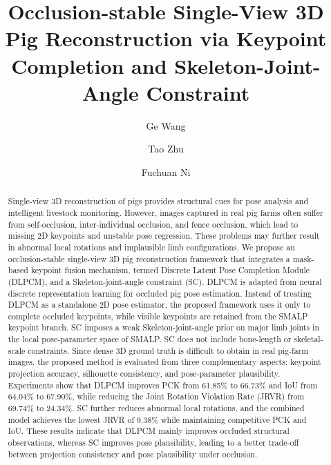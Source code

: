 \documentclass[runningheads]{llncs}
\begin{document}
\title{Occlusion-stable Single-View 3D Pig Reconstruction via Keypoint Completion and Skeleton-Joint-Angle Constraint}


\author{Ge Wang \and Tao Zhu \and Fuchuan Ni}



\maketitle

\begin{abstract}
Single-view 3D reconstruction of pigs provides structural cues for pose analysis and intelligent livestock monitoring. However, images captured in real pig farms often suffer from self-occlusion, inter-individual occlusion, and fence occlusion, which lead to missing 2D keypoints and unstable pose regression. These problems may further result in abnormal local rotations and implausible limb configurations. We propose an occlusion-stable single-view 3D pig reconstruction framework that integrates a mask-based keypoint fusion mechanism, termed Discrete Latent Pose Completion Module (DLPCM), and a Skeleton-joint-angle constraint (SC). DLPCM is adapted from neural discrete representation learning for occluded pig pose estimation. Instead of treating DLPCM as a standalone 2D pose estimator, the proposed framework uses it only to complete occluded keypoints, while visible keypoints are retained from the SMALP keypoint branch. SC imposes a weak Skeleton-joint-angle prior on major limb joints in the local pose-parameter space of SMALP. SC does not include bone-length or skeletal-scale constraints. Since dense 3D ground truth is difficult to obtain in real pig-farm images, the proposed method is evaluated from three complementary aspects: keypoint projection accuracy, silhouette consistency, and pose-parameter plausibility. Experiments show that DLPCM improves PCK from 61.85\% to 66.73\% and IoU from 64.04\% to 67.90\%, while reducing the Joint Rotation Violation Rate (JRVR) from 69.74\% to 24.34\%. SC further reduces abnormal local rotations, and the combined model achieves the lowest JRVR of 9.38\% while maintaining competitive PCK and IoU. These results indicate that DLPCM mainly improves occluded structural observations, whereas SC improves pose plausibility, leading to a better trade-off between projection consistency and pose plausibility under occlusion.

\end{abstract}
\end{document}
